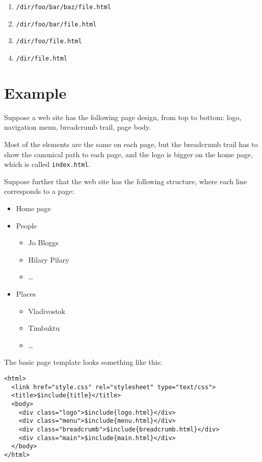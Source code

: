 \documentclass[english]{scrartcl}
\begin{document}
\begin{enumerate}
\item \verb|/dir/foo/bar/baz/file.html|
\item \verb|/dir/foo/bar/file.html|
\item \verb|/dir/foo/file.html|
\item \verb|/dir/file.html|
\end{enumerate}

\section{Example}

Suppose a web site has the following page design, from top to bottom: logo, navigation menu, breadcrumb trail, page body.

Most of the elements are the same on each page, but the breadcrumb trail has to show the canonical path to each page, and the logo is bigger on the home page, which is called \verb|index.html|.

Suppose further that the web site has the following structure, where each line corresponds to a page:

\begin{itemize}
\item Home page
\item People
  \begin{itemize}
  \item Jo Bloggs
  \item Hilary Pilary
  \item \dots
  \end{itemize}
\item Places
  \begin{itemize}
  \item Vladivostok
  \item Timbuktu
  \item \dots
  \end{itemize}
\end{itemize}

The basic page template looks something like this:

\begin{verbatim}
<html>
  <link href="style.css" rel="stylesheet" type="text/css">
  <title>$include{title}</title>
  <body>
    <div class="logo">$include{logo.html}</div>
    <div class="menu">$include{menu.html}</div>
    <div class="breadcrumb">$include{breadcrumb.html}</div>
    <div class="main">$include{main.html}</div>
  </body>
</html>
\end{verbatim}
\end{document}
